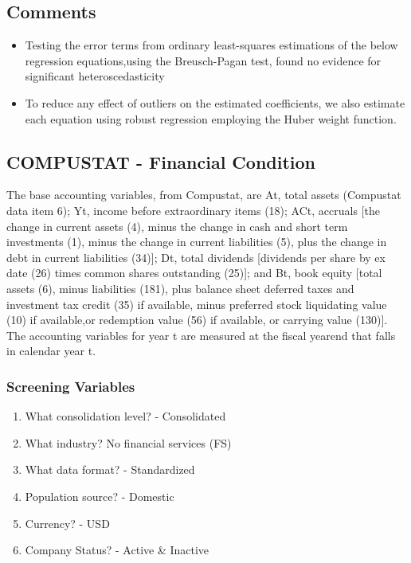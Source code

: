 \documentclass[12pt]{article}
\begin{document}
    \subsection{Comments}

    \begin{itemize}
        \item Testing the error terms from ordinary least-squares estimations of the below regression equations,using the Breusch-Pagan test, found no evidence for significant heteroscedasticity \citet{Brigida2012}
        \item To reduce any effect of outliers on the estimated coefficients, we also estimate each equation using robust regression employing the Huber weight function. \cite{Brigida2012}
    \end{itemize}

    \subsection{COMPUSTAT - Financial Condition}
    The base accounting variables, from Compustat, are At, total assets (Compustat data
    item 6); Yt, income before extraordinary items (18); ACt, accruals [the change in current assets (4), minus the change in cash and short term investments (1), minus the change in
    current liabilities (5), plus the change in debt in current liabilities (34)]; Dt, total dividends [dividends per share by ex date (26) times common shares outstanding (25)]; and Bt, book equity  [total assets (6), minus liabilities (181), plus balance sheet deferred taxes and
    investment tax credit (35) if available, minus preferred stock liquidating value (10) if available,or redemption value (56) if available, or carrying value (130)]. The accounting variables for year t are measured at the fiscal yearend that falls in calendar year t. \citet{Fama2006}
        \subsubsection{Screening Variables}

        \begin{enumerate}
            \item What consolidation level? - Consolidated
            \item What industry? No financial services (FS) 
            \item What data format?  - Standardized 
            \item Population source? - Domestic 
            \item Currency? - USD 
            \item Company Status? - Active \& Inactive  
        \end{enumerate}
\end{document}
